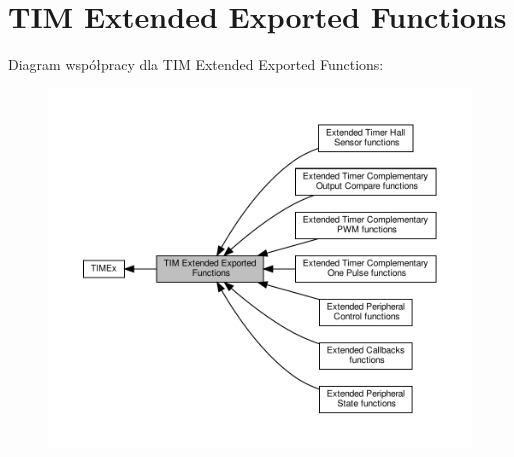 \hypertarget{group___t_i_m_ex___exported___functions}{}\section{T\+IM Extended Exported Functions}
\label{group___t_i_m_ex___exported___functions}
Diagram współpracy dla T\+IM Extended Exported Functions\+:\nopagebreak
\begin{figure}[H]
\begin{center}
\leavevmode
\includegraphics[width=350pt]{group___t_i_m_ex___exported___functions}
\end{center}
\end{figure}
